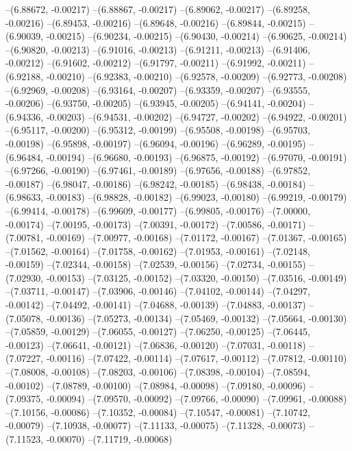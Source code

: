 --(6.88672, -0.00217)
--(6.88867, -0.00217)
--(6.89062, -0.00217)
--(6.89258, -0.00216)
--(6.89453, -0.00216)
--(6.89648, -0.00216)
--(6.89844, -0.00215)
--(6.90039, -0.00215)
--(6.90234, -0.00215)
--(6.90430, -0.00214)
--(6.90625, -0.00214)
--(6.90820, -0.00213)
--(6.91016, -0.00213)
--(6.91211, -0.00213)
--(6.91406, -0.00212)
--(6.91602, -0.00212)
--(6.91797, -0.00211)
--(6.91992, -0.00211)
--(6.92188, -0.00210)
--(6.92383, -0.00210)
--(6.92578, -0.00209)
--(6.92773, -0.00208)
--(6.92969, -0.00208)
--(6.93164, -0.00207)
--(6.93359, -0.00207)
--(6.93555, -0.00206)
--(6.93750, -0.00205)
--(6.93945, -0.00205)
--(6.94141, -0.00204)
--(6.94336, -0.00203)
--(6.94531, -0.00202)
--(6.94727, -0.00202)
--(6.94922, -0.00201)
--(6.95117, -0.00200)
--(6.95312, -0.00199)
--(6.95508, -0.00198)
--(6.95703, -0.00198)
--(6.95898, -0.00197)
--(6.96094, -0.00196)
--(6.96289, -0.00195)
--(6.96484, -0.00194)
--(6.96680, -0.00193)
--(6.96875, -0.00192)
--(6.97070, -0.00191)
--(6.97266, -0.00190)
--(6.97461, -0.00189)
--(6.97656, -0.00188)
--(6.97852, -0.00187)
--(6.98047, -0.00186)
--(6.98242, -0.00185)
--(6.98438, -0.00184)
--(6.98633, -0.00183)
--(6.98828, -0.00182)
--(6.99023, -0.00180)
--(6.99219, -0.00179)
--(6.99414, -0.00178)
--(6.99609, -0.00177)
--(6.99805, -0.00176)
--(7.00000, -0.00174)
--(7.00195, -0.00173)
--(7.00391, -0.00172)
--(7.00586, -0.00171)
--(7.00781, -0.00169)
--(7.00977, -0.00168)
--(7.01172, -0.00167)
--(7.01367, -0.00165)
--(7.01562, -0.00164)
--(7.01758, -0.00162)
--(7.01953, -0.00161)
--(7.02148, -0.00159)
--(7.02344, -0.00158)
--(7.02539, -0.00156)
--(7.02734, -0.00155)
--(7.02930, -0.00153)
--(7.03125, -0.00152)
--(7.03320, -0.00150)
--(7.03516, -0.00149)
--(7.03711, -0.00147)
--(7.03906, -0.00146)
--(7.04102, -0.00144)
--(7.04297, -0.00142)
--(7.04492, -0.00141)
--(7.04688, -0.00139)
--(7.04883, -0.00137)
--(7.05078, -0.00136)
--(7.05273, -0.00134)
--(7.05469, -0.00132)
--(7.05664, -0.00130)
--(7.05859, -0.00129)
--(7.06055, -0.00127)
--(7.06250, -0.00125)
--(7.06445, -0.00123)
--(7.06641, -0.00121)
--(7.06836, -0.00120)
--(7.07031, -0.00118)
--(7.07227, -0.00116)
--(7.07422, -0.00114)
--(7.07617, -0.00112)
--(7.07812, -0.00110)
--(7.08008, -0.00108)
--(7.08203, -0.00106)
--(7.08398, -0.00104)
--(7.08594, -0.00102)
--(7.08789, -0.00100)
--(7.08984, -0.00098)
--(7.09180, -0.00096)
--(7.09375, -0.00094)
--(7.09570, -0.00092)
--(7.09766, -0.00090)
--(7.09961, -0.00088)
--(7.10156, -0.00086)
--(7.10352, -0.00084)
--(7.10547, -0.00081)
--(7.10742, -0.00079)
--(7.10938, -0.00077)
--(7.11133, -0.00075)
--(7.11328, -0.00073)
--(7.11523, -0.00070)
--(7.11719, -0.00068)
